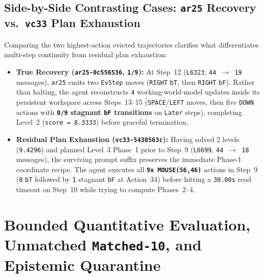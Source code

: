 \documentclass[10pt]{article}
\newcommand{\code}[1]{\texttt{#1}}
\begin{document}
\subsection{Side-by-Side Contrasting Cases: \code{ar25} Recovery vs.\ \code{vc33} Plan Exhaustion}
Comparing the two highest-action evicted trajectories clarifies what differentiates multi-step continuity from residual plan exhaustion:
\begin{itemize}[leftmargin=1.4em,itemsep=2pt]
\item \textbf{True Recovery (\code{ar25-0c556536}, \code{1/9}):} At Step~12 (\code{L6323}, \code{44 $\to$ 19} messages), \code{ar25} emits two \code{EvStep} moves (\code{RIGHT} \code{bT}, then \code{RIGHT} \code{bF}). Rather than halting, the agent reconstructs \code{4} working-world-model updates inside its persistent workspace across Steps~13--15 (\code{SPACE}/\code{LEFT} moves, then five \code{DOWN} actions with \textbf{\code{0/9} stagnant \code{bF} transitions} on \code{Later} steps), completing Level~2 (\code{score = 8.3333}) before graceful termination.
\item \textbf{Residual Plan Exhaustion (\code{vc33-5430563c}):} Having solved 2 levels (\code{9.4296}) and planned Level~3 Phase~1 prior to Step~9 (\code{L6699}, \code{44 $\to$ 18} messages), the surviving prompt suffix preserves the immediate Phase-1 coordinate recipe. The agent executes all \textbf{\code{9x MOUSE(56,46)}} actions in Step~9 (\code{8} \code{bT} followed by \code{1} stagnant \code{bF} at Action~34) before hitting a \code{30.00s} read timeout on Step~10 while trying to compute Phases~2--4.
\end{itemize}

\section{Bounded Quantitative Evaluation, Unmatched \code{Matched-10}, and Epistemic Quarantine}
\label{sec:eval}
\end{document}
